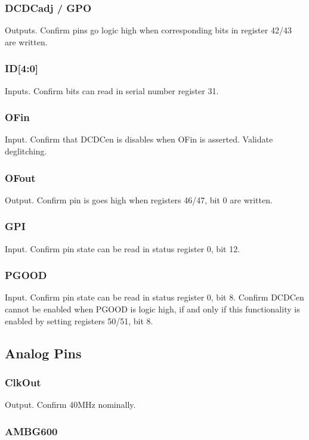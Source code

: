 \documentclass[11pt]{article}   			%
\begin{document}
\subsubsection{DCDCadj / GPO}
Outputs. Confirm pins go logic high when corresponding bits in register 42/43 are written.

\subsubsection{ID[4:0]}
Inputs. Confirm bits can read in serial number register 31.

\subsubsection{OFin}
Input. Confirm that DCDCen is disables when OFin is asserted. Validate deglitching.

\subsubsection{OFout}
Output. Confirm pin is goes high when registers 46/47, bit 0 are written.

\subsubsection{GPI}
Input. Confirm pin state can be read in status register 0, bit 12.

\subsubsection{PGOOD}
Input. Confirm pin state can be read in status register 0, bit 8. Confirm DCDCen cannot be enabled when 
PGOOD is logic high, if and only if this functionality is enabled by setting registers 50/51, bit 8.

\subsection{Analog Pins}

\subsubsection{ClkOut}
Output. Confirm 40MHz nominally.

\subsubsection{AMBG600}
\end{document}
